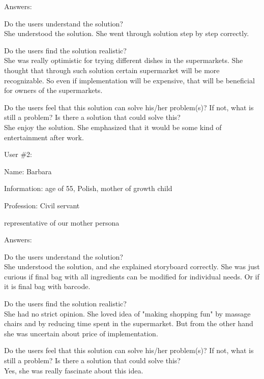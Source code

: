 \documentclass[a4paper,10pt,oneside]{scrreprt}
\begin{document}
Answers:
\begin{compactitem}
	\item Do the users understand the solution?\\
	She understood the solution. She went through solution step by step correctly.
	
	\item Do the users find the solution realistic?\\
	She was really optimistic for trying different dishes in the supermarkets. She thought that through such solution certain supermarket will be more recognizable. So even if implementation will be expensive, that will be beneficial for owners of the supermarkets.
	
	\item Do the users feel that this solution can solve his/her problem(s)? If not, what is still
	a problem? Is there a solution that could solve this?\\
	She enjoy the solution. She emphasized that it would be some kind of entertainment after work.

\end{compactitem}
\bigskip

User \#2:
\begin{compactitem}
	\item Name: Barbara
	\item Information: age of 55, Polish, mother of growth child
	\item Profession: Civil servant
	\item representative of our mother persona 
\end{compactitem}
\bigskip

Answers:
\begin{compactitem}
	\item Do the users understand the solution?\\
	She understood the solution, and she explained storyboard correctly. She was just curious if final bag with all ingredients can be modified for individual needs. Or if it is final bag with barcode.\\
	
	\item Do the users find the solution realistic?\\
	She had no strict opinion. She loved idea of "making shopping fun" by massage chairs and by reducing time spent in the supermarket. But from the other hand she was uncertain about price of implementation.
\\
	
	\item Do the users feel that this solution can solve his/her problem(s)? If not, what is still
	a problem? Is there a solution that could solve this?\\
	 Yes, she was really fascinate about this idea.\\
\end{compactitem}
\bigskip
\end{document}
